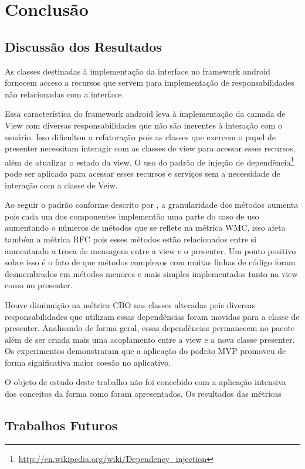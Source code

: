 \chapter{Conclusão}

\section{Discussão dos Resultados}
As classes destinadas à implementação da interface no framework android fornecem
acceso a recursos que servem para implementação de responsabilidades não
relacionadas com a interface.

Essa característica do framework android leva à implementação da camada de View
com diversas responsabilidades que não são inerentes à interação com o
usuário. Isso dificultou a refatoração pois as classes que exercem o papel de
presenter necessitam interagir com as classes de view para acessar esses
recursos, além de atualizar o estado da view. O uso do padrão de injeção de
dependência\footnote{\url{http://en.wikipedia.org/wiki/Dependency_injection}}
pode ser aplicado para acessar esses recursos e serviços sem a necessidade de interação com a classe de Veiw.

Ao seguir o padrão conforme descrito por , a granularidade dos
métodos aumenta pois cada um dos componentes implementão uma parte do caso de
uso aumentando o números de métodos que se reflete na métrica WMC, isso afeta
também a métrica RFC pois esses métodos estão relacionados entre si aumentando a
troca de mensagens entre a view e o presenter. Um ponto positivo sobre isso é o
fato de que métodos  complexos com muitas linhas de código foram desmembrados em
métodos menores e mais simples implementados tanto na view como no presenter.

Houve diminuição na métrica CBO nas classes alteradas pois diversas
responsabilidades que utilizam essas dependências foram movidas para a classe de
presenter. Analisando de forma geral, essas dependências permanecem no pacote
além de ser criada mais uma acoplamento entre a view e a nova classe presenter.
Os experimentos demonstraram que a aplicação do padrão MVP promoveu de forma
significativa maior coesão no aplicativo.

O objeto de estudo deste trabalho não foi concebido com a aplicação intensiva
dos conceitos da forma como foram apresentados. Os resultados das métricas 


\section{Trabalhos Futuros}

